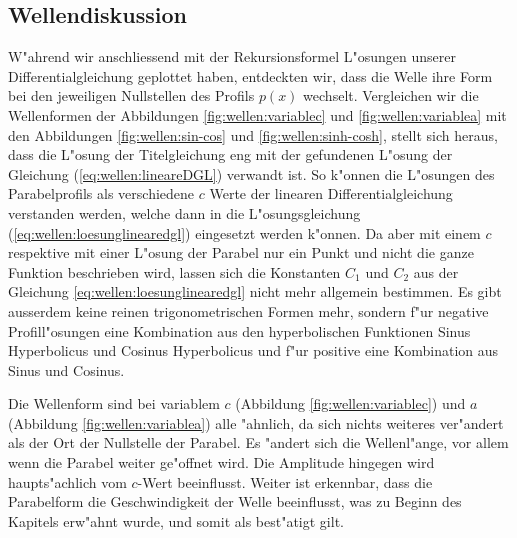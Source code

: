 \subsection{Wellendiskussion}
\label{sec:wellen:diskussionwellenform}

W"ahrend wir anschliessend mit der Rekursionsformel L"osungen unserer 
Differentialgleichung geplottet haben, entdeckten wir, dass die Welle ihre Form 
bei den jeweiligen Nullstellen des Profils $p(x)$ wechselt. Vergleichen wir die 
Wellenformen der Abbildungen \ref{fig:wellen:variablec} und 
\ref{fig:wellen:variablea} mit den Abbildungen \ref{fig:wellen:sin-cos} und 
\ref{fig:wellen:sinh-cosh}, stellt sich heraus, dass die L"osung der 
Titelgleichung eng mit der gefundenen L"osung der Gleichung 
(\ref{eq:wellen:lineareDGL}) verwandt ist. So k"onnen die L"osungen des 
Parabelprofils als verschiedene $c$ Werte der linearen Differentialgleichung 
verstanden werden, welche dann in die L"osungsgleichung 
(\ref{eq:wellen:loesunglinearedgl}) eingesetzt werden k"onnen. 
Da aber mit einem $c$ respektive mit einer L"osung der Parabel nur ein Punkt 
und nicht die ganze Funktion beschrieben wird, lassen sich die Konstanten $C_1$ 
und $C_2$ aus der Gleichung \ref{eq:wellen:loesunglinearedgl} nicht mehr 
allgemein bestimmen. Es gibt ausserdem keine reinen trigonometrischen Formen 
mehr, sondern f"ur negative Profill"osungen eine Kombination aus den 
hyperbolischen Funktionen Sinus Hyperbolicus und Cosinus Hyperbolicus und f"ur 
positive eine Kombination aus Sinus und Cosinus.

Die Wellenform sind bei variablem $c$ (Abbildung \ref{fig:wellen:variablec}) 
und $a$ (Abbildung \ref{fig:wellen:variablea}) alle "ahnlich, da sich nichts 
weiteres ver"andert als der Ort der Nullstelle der Parabel. Es "andert sich die 
Wellenl"ange, vor allem wenn die Parabel weiter ge"offnet wird. Die Amplitude 
hingegen wird haupts"achlich vom $c$-Wert beeinflusst. Weiter ist erkennbar, 
dass die Parabelform die Geschwindigkeit der Welle beeinflusst, was zu Beginn 
des Kapitels erw"ahnt wurde, und somit als best"atigt gilt.

